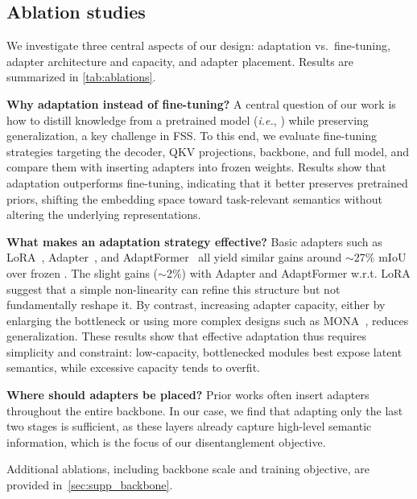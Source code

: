 \subsection{Ablation studies}


We investigate three central aspects of our design: adaptation vs.\ fine-tuning, adapter architecture and capacity, and adapter placement. Results are summarized in \cref{tab:ablations}.

\textbf{Why adaptation instead of fine-tuning?} A central question of our work is how to distill knowledge from a pretrained model (\textit{i.e.}, \sam{}) while preserving generalization, a key challenge in FSS.
To this end, we evaluate fine-tuning strategies targeting the decoder, QKV projections, backbone, and full model, and compare them with inserting adapters into frozen weights. Results show that adaptation outperforms fine-tuning, indicating that it better preserves \sam{} pretrained priors, shifting the embedding space toward task-relevant semantics without altering the underlying representations. 

\textbf{What makes an adaptation strategy effective?}  
Basic adapters such as LoRA~\cite{hu2022lora}, Adapter~\cite{houlsby2019adapter}, and AdaptFormer~\cite{chen2022adaptformer} all yield similar gains around $\sim$27\% mIoU over frozen \sam{}. The slight gains ($\sim$2\%) with Adapter and AdaptFormer w.r.t. LoRA suggest that a simple non-linearity can refine this structure but not fundamentally reshape it. By contrast, increasing adapter capacity, either by enlarging the bottleneck or using more complex designs such as MONA~\cite{yin20255}, reduces generalization. These results show that effective adaptation thus requires simplicity and constraint: low-capacity, bottlenecked modules best expose \sam{} latent semantics, while excessive capacity tends to overfit.


\textbf{Where should adapters be placed?}  
Prior works often insert adapters throughout the entire backbone. In our case, we find that adapting only the last two stages is sufficient, as these layers already capture high-level semantic information, which is the focus of our disentanglement objective.

Additional ablations, including backbone scale and training objective, are provided in~\cref{sec:supp_backbone}.



